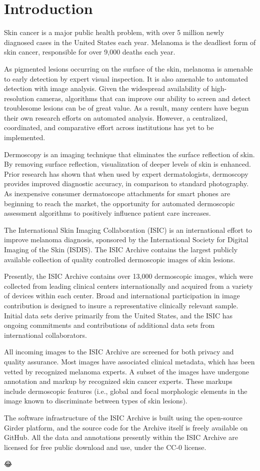 \chapter{Introduction}
\label{chapter:introduction}

Skin cancer is a major public health problem, with over 5 million newly diagnosed cases in the United States each year. Melanoma is the deadliest form of skin cancer, responsible for over 9,000 deaths each year.

As pigmented lesions occurring on the surface of the skin, melanoma is amenable to early detection by expert visual inspection. It is also amenable to automated detection with image analysis. Given the widespread availability of high-resolution cameras, algorithms that can improve our ability to screen and detect troublesome lesions can be of great value. As a result, many centers have begun their own research efforts on automated analysis. However, a centralized, coordinated, and comparative effort across institutions has yet to be implemented.

Dermoscopy is an imaging technique that eliminates the surface reflection of skin. By removing surface reflection, visualization of deeper levels of skin is enhanced. Prior research has shown that when used by expert dermatologists, dermoscopy provides improved diagnostic accuracy, in comparison to standard photography. As inexpensive consumer dermatoscope attachments for smart phones are beginning to reach the market, the opportunity for automated dermoscopic assessment algorithms to positively influence patient care increases.

The International Skin Imaging Collaboration (ISIC) is an international effort to improve melanoma diagnosis, sponsored by the International Society for Digital Imaging of the Skin (ISDIS). The ISIC Archive contains the largest publicly available collection of quality controlled dermoscopic images of skin lesions.

Presently, the ISIC Archive contains over 13,000 dermoscopic images, which were collected from leading clinical centers internationally and acquired from a variety of devices within each center. Broad and international participation in image contribution is designed to insure a representative clinically relevant sample. Initial data sets derive primarily from the United States, and the ISIC has ongoing commitments and contributions of additional data sets from international collaborators.

All incoming images to the ISIC Archive are screened for both privacy and quality assurance. Most images have associated clinical metadata, which has been vetted by recognized melanoma experts. A subset of the images have undergone annotation and markup by recognized skin cancer experts. These markups include dermoscopic features (i.e., global and focal morphologic elements in the image known to discriminate between types of skin lesions).

The software infrastructure of the ISIC Archive is built using the open-source Girder platform, and the source code for the Archive itself is freely available on GitHub. All the data and annotations presently within the ISIC Archive are licensed for free public download and use, under the CC-0 license.

😂

